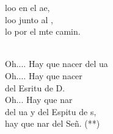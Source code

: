 \begin{cancion}
	loo en el ae,\\
	loo junto al ,\\
	lo  por el mte camin.\\\jump\\
	\begin{chorus}%
	Oh.... Hay que nacer del ua\\
	Oh.... Hay que nacer\\
	del Esritu de D. \\
	Oh... Hay que nar\\
	del ua y del Espitu de s,\\
	hay que nar del Señ. (**) \\
	\end{chorus}%
	\jump\\
\end{cancion}%
